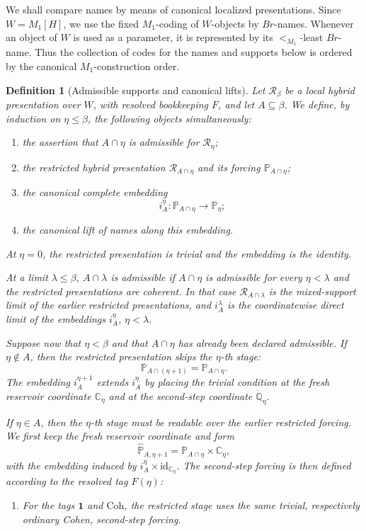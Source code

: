 \documentclass[a4paper,11pt]{article}
\newtheorem{definition}[theorem]{Definition}
\begin{document}
We shall compare names by means of canonical localized presentations.  Since
\(W=M_1[H]\), we use the fixed \(M_1\)-coding of \(W\)-objects by
\(Br\)-names.  Whenever an object of \(W\) is used as a parameter, it is
represented by its \(<_{M_1}\)-least \(Br\)-name.  Thus the collection of codes
for the names and supports below is ordered by the canonical
\(M_1\)-construction order.

\begin{definition}[Admissible supports and canonical lifts]
\label{def:admissible-supports-canonical-lifts}
Let \(\mathcal R_\beta\) be a local hybrid presentation over \(W\), with resolved
bookkeeping \(F\), and let \(A\subseteq\beta\).  We define, by induction on
\(\eta\leq\beta\), the following objects simultaneously:
\begin{enumerate}
   \item the assertion that \(A\cap\eta\) is admissible for
   \(\mathcal R_\eta\);
   \item the restricted hybrid presentation \(\mathcal R_{A\cap\eta}\) and its
   forcing \(\mathbb P_{A\cap\eta}\);
   \item the canonical complete embedding
   \[
      i_A^\eta:\mathbb P_{A\cap\eta}\longrightarrow\mathbb P_\eta;
   \]
   \item the canonical lift of names along this embedding.
\end{enumerate}
At \(\eta=0\), the restricted presentation is trivial and the embedding is the
identity.

At a limit \(\lambda\leq\beta\), \(A\cap\lambda\) is admissible if
\(A\cap\eta\) is admissible for every \(\eta<\lambda\) and the restricted
presentations are coherent.  In that case \(\mathcal R_{A\cap\lambda}\) is the
mixed-support limit of the earlier restricted presentations, and
\(i_A^\lambda\) is the coordinatewise direct limit of the embeddings
\(i_A^\eta\), \(\eta<\lambda\).

Suppose now that \(\eta<\beta\) and that \(A\cap\eta\) has already been declared
admissible.  If \(\eta\notin A\), then the restricted presentation skips the
\(\eta\)-th stage:
\[
   \mathbb P_{A\cap(\eta+1)}=\mathbb P_{A\cap\eta}.
\]
The embedding \(i_A^{\eta+1}\) extends \(i_A^\eta\) by placing the trivial
condition at the fresh reservoir coordinate \(\mathbb C_\eta\) and at the
second-step coordinate \(\dot{\mathbb Q}_\eta\).

If \(\eta\in A\), then the \(\eta\)-th stage must be readable over the earlier
restricted forcing.  We first keep the fresh reservoir coordinate and form
\[
   \widehat{\mathbb P}_{A,\eta+1}
      =\mathbb P_{A\cap\eta}\times\mathbb C_\eta,
\]
with the embedding induced by \(i_A^\eta\times\mathrm{id}_{\mathbb C_\eta}\).
The second-step forcing is then defined according to the resolved tag
\(F(\eta)\):
\begin{enumerate}
   \item For the tags \(\mathbf 1\) and \(\mathrm{Coh}\), the restricted stage
   uses the same trivial, respectively ordinary Cohen, second-step forcing.


\end{enumerate}
\end{definition}
\end{document}
